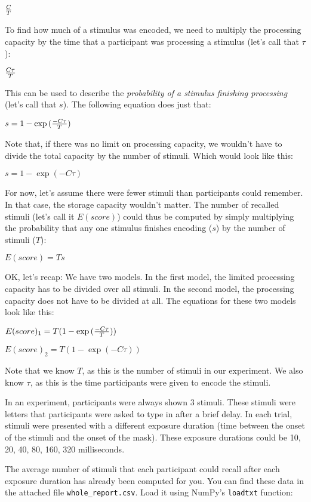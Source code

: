 \documentclass[11pt]{article}
\begin{document}
\({{C} \over {T}}\)

To find how much of a stimulus was encoded, we need to multiply the
processing capacity by the time that a participant was processing a
stimulus (let's call that \(\tau\)):

\({{C \tau} \over {T}}\)

This can be used to describe the \emph{probability of a stimulus
finishing processing} (let's call that \(s\)). The following equation
does just that:

\(s = 1 - \exp{({{-C \tau} \over {T}})}\)

Note that, if there was no limit on processing capacity, we wouldn't
have to divide the total capacity by the number of stimuli. Which would
look like this:

\(s = 1 - \exp{(-C \tau)}\)

For now, let's assume there were fewer stimuli than participants could
remember. In that case, the storage capacity wouldn't matter. The number
of recalled stimuli (let's call it \(E(score)\)) could thus be computed
by simply multiplying the probability that any one stimulus finishes
encoding (\(s\)) by the number of stimuli (\(T\)):

\(E(score) = Ts\)

OK, let's recap: We have two models. In the first model, the limited
processing capacity has to be divided over all stimuli. In the second
model, the processing capacity does not have to be divided at all. The
equations for these two models look like this:

\(E(score)_{1} = T (1 - \exp{({{-C \tau} \over {T}})})\)

\(E(score)_{2} = T (1 - \exp{(-C \tau)})\)

Note that we know \(T\), as this is the number of stimuli in our
experiment. We also know \(\tau\), as this is the time participants were
given to encode the stimuli.

In an experiment, participants were always shown 3 stimuli. These
stimuli were letters that participants were asked to type in after a
brief delay. In each trial, stimuli were presented with a different
exposure duration (time between the onset of the stimuli and the onset
of the mask). These exposure durations could be 10, 20, 40, 80, 160, 320
milliseconds.

The average number of stimuli that each participant could recall after
each exposure duration has already been computed for you. You can find
these data in the attached file \texttt{whole\_report.csv}. Load it
using NumPy's \texttt{loadtxt} function:
\end{document}
